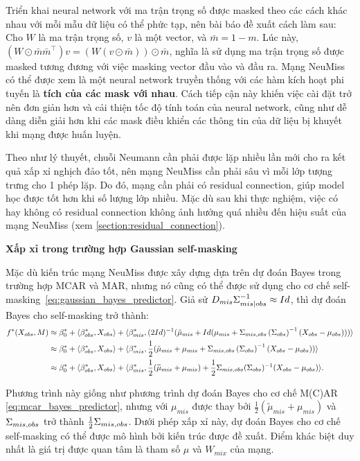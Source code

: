 Triển khai neural network với ma trận trọng số được masked theo các cách khác nhau với mỗi mẫu dữ liệu có thể phức tạp, nên bài báo đề xuất cách làm sau: Cho $W$ là ma trận trọng số, $v$ là một vector, và $\bar{m} = 1 - m$. Lúc này, $(W\odot \bar{m} \bar{m}^{\top}) v = (W(v \odot \bar{m}))\odot \bar{m}$, nghĩa là sử dụng ma trận trọng số được masked tương đương với việc masking vector đầu vào và đầu ra. Mạng NeuMiss có thể được xem là một neural network truyền thống với các hàm kích hoạt phi tuyến là \textbf{tích của các mask với nhau}. Cách tiếp cận này khiến việc cài đặt trở nên đơn giản hơn và cải thiện tốc độ tính toán của neural network, cũng như dễ dàng diễn giải hơn khi các mask điều khiển các thông tin của dữ liệu bị khuyết khi mạng được huấn luyện.

Theo như lý thuyết, chuỗi Neumann cần phải được lặp nhiều lần mới cho ra kết quả xấp xỉ nghịch đảo tốt, nên mạng NeuMiss cần phải sâu vì mỗi lớp tượng trưng cho 1 phép lặp. Do đó, mạng cần phải có residual connection, giúp model học được tốt hơn khi số lượng lớp nhiều.
Mặc dù sau khi thực nghiệm, việc có hay không có residual connection không ảnh hưởng quá nhiều đến hiệu suất của mạng NeuMiss (xem \ref{section:residual_connection}).


\textbf{Xấp xỉ trong trường hợp Gaussian self-masking}

Mặc dù kiến trúc mạng NeuMiss được xây dựng dựa trên dự đoán Bayes trong trường hợp MCAR và MAR, nhưng nó cũng có thể được sử dụng cho cơ chế self-masking~\eqref{eq:gaussian_bayes_predictor}. Giả sử $D_{mis} \Sigma_{mis|obs}^{-1} \approx Id$, thì dự đoán Bayes cho self-masking trở thành:
\begin{align*}
    f^*(X_{obs}, M) 
    &\approx \beta_{0}^{*} + \langle\beta_{obs}^{*}, X_{obs}\rangle 
    + \langle\beta_{mis}^{*},(2Id)^{-1} (\tilde{\mu}_{mis} + Id(\mu_{mis} + \Sigma_{mis,obs}\left(\Sigma_{obs}\right)^{-1} (X_{obs}-\mu_{obs}))) \rangle \\
    &\approx \beta_{0}^{*} + \langle\beta_{obs}^{*}, X_{obs}\rangle 
    + \langle\beta_{mis}^{*}, \frac{1}{2}(\tilde{\mu}_{mis} + \mu_{mis} + \Sigma_{mis,obs}\left(\Sigma_{obs}\right)^{-1} (X_{obs}-\mu_{obs})) \rangle \\
    &\approx \beta_0^* + \langle \beta_{obs}^*, X_{obs}\rangle + \langle \beta_{mis}^*, \frac{1}{2} (\widetilde{\mu}_{mis} + \mu_{mis}) + \frac{1}{2}  \Sigma_{mis,obs} (\Sigma_{obs})^{-1} (X_{obs} - \mu_{obs}) \rangle.
\end{align*}

Phương trình này giống như phương trình dự đoán Bayes cho cơ chế M(C)AR \eqref{eq:mcar_bayes_predictor}, nhưng với $\mu_{mis}$ được thay bởi $\frac{1}{2} (\widetilde{\mu}_{mis} + \mu_{mis})$ và $\Sigma_{mis,obs}$ trở thành $\frac{1}{2}\Sigma_{mis,obs}$. Dưới phép xấp xỉ này, dự đoán Bayes cho cơ chế self-masking có thể được mô hình bởi kiến trúc được đề xuất. Điểm khác biệt duy nhất là giá trị được quan tâm là tham số $\mu$ và $W_{mix}$ của mạng.

